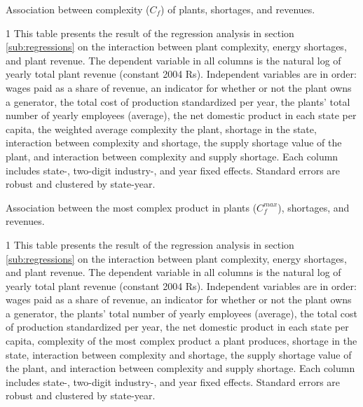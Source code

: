 \documentclass[11pt]{article}
\begin{document}
\begin{sidewaystable}
	\begin{center}
		\begin{threeparttable}
		\caption{Association between complexity ($C_{f}$) of plants, shortages, and revenues.}
			\label{tab:interaction_avg_pci}
			
			\begin{tablenotes} \footnotesize
			\item[1] This table presents the result of the regression analysis in section \ref{sub:regressions} on the interaction between plant complexity, energy shortages, and plant revenue. The dependent variable in all columns is the natural log of yearly total plant revenue (constant 2004 Rs). Independent variables are in order: wages paid as a share of revenue, an indicator for whether or not the plant owns a generator, the total cost of production standardized per year, the plants' total number of yearly employees (average), the net domestic product in each state per capita, the weighted average complexity the plant, shortage in the state, interaction between complexity and shortage, the supply shortage value of the plant, and interaction between complexity and supply shortage. Each column includes state-, two-digit industry-, and year fixed effects. Standard errors are robust and clustered by state-year.
			\end{tablenotes}
		\end{threeparttable}
	\end{center}
\end{sidewaystable}


\begin{sidewaystable}
	\begin{center}
		\begin{threeparttable}
		\caption{Association between the most complex product in plants ($C^{max}_{f}$), shortages, and revenues.}
			\label{tab:interaction_max_pci}
			
			\begin{tablenotes} \footnotesize
			\item[1] This table presents the result of the regression analysis in section \ref{sub:regressions} on the interaction between plant complexity, energy shortages, and plant revenue. The dependent variable in all columns is the natural log of yearly total plant revenue (constant 2004 Rs). Independent variables are in order: wages paid as a share of revenue, an indicator for whether or not the plant owns a generator, the plants' total number of yearly employees (average), the total cost of production standardized per year, the net domestic product in each state per capita, complexity of the most complex product a plant produces, shortage in the state, interaction between complexity and shortage, the supply shortage value of the plant, and interaction between complexity and supply shortage. Each column includes state-, two-digit industry-, and year fixed effects. Standard errors are robust and clustered by state-year.
			\end{tablenotes}
		\end{threeparttable}
	\end{center}
\end{sidewaystable}
\end{document}
